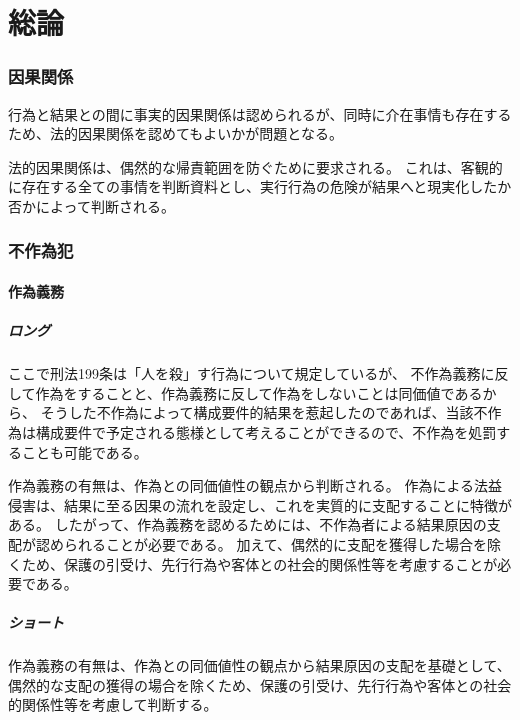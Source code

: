 \documentclass[11pt]{jsarticle}
\title{\vspace{-30mm}{\textgt{\Large{刑法論証集}}}}
\date{\vspace{-15mm}}
\begin{document}
\maketitle
\tableofcontents
\clearpage

\part{総論}

	\section{因果関係}
		行為と結果との間に事実的因果関係は認められるが、同時に介在事情も存在するため、法的因果関係を認めてもよいかが問題となる。
		
		法的因果関係は、偶然的な帰責範囲を防ぐために要求される。
		これは、客観的に存在する全ての事情を判断資料とし、実行行為の危険が結果へと現実化したか否かによって判断される。
		
	\section{不作為犯}
		\subsection{作為義務}
			\subsubsection{ロング}
				ここで刑法199条は「人を殺」す行為について規定しているが、
				不作為義務に反して作為をすることと、作為義務に反して作為をしないことは同価値であるから、
				そうした不作為によって構成要件的結果を惹起したのであれば、当該不作為は構成要件で予定される態様として考えることができるので、不作為を処罰することも可能である。
		
				作為義務の有無は、作為との同価値性の観点から判断される。
				作為による法益侵害は、結果に至る因果の流れを設定し、これを実質的に支配することに特徴がある。
				したがって、作為義務を認めるためには、不作為者による結果原因の支配が認められることが必要である。
				加えて、偶然的に支配を獲得した場合を除くため、保護の引受け、先行行為や客体との社会的関係性等を考慮することが必要である。
			
			\subsubsection{ショート}
				作為義務の有無は、作為との同価値性の観点から結果原因の支配を基礎として、
				偶然的な支配の獲得の場合を除くため、保護の引受け、先行行為や客体との社会的関係性等を考慮して判断する。
	
\end{document}
